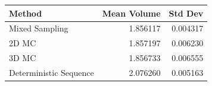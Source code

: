 \begin{tabular}{lrr}
\toprule
Method & Mean Volume & Std Dev \\
\midrule
Mixed Sampling & 1.856117 & 0.004317 \\
2D MC & 1.857197 & 0.006230 \\
3D MC & 1.856733 & 0.006555 \\
Deterministic Sequence & 2.076260 & 0.005163 \\
\bottomrule
\end{tabular}
